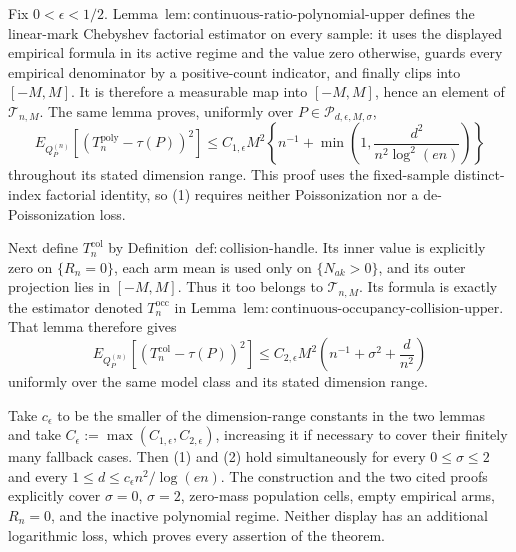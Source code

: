 Fix \(0<\epsilon<1/2\).  Lemma~\(\mathrm{lem:continuous\text{-}ratio\text{-}polynomial\text{-}upper}\) defines the linear-mark Chebyshev factorial estimator on every sample: it uses the displayed empirical formula in its active regime and the value zero otherwise, guards every empirical denominator by a positive-count indicator, and finally clips into \([-M,M]\).  It is therefore a measurable map into \([-M,M]\), hence an element of \(\mathcal T_{n,M}\).  The same lemma proves, uniformly over \(P\in\mathcal P_{d,\epsilon,M,\sigma}\),
\[
 E_{Q_P^{(n)}}[(T_n^{\mathrm{poly}}-\tau(P))^2]
 \le C_{1,\epsilon}M^2\left\{n^{-1}+
 \min\left(1,\frac{d^2}{n^2\log^2(en)}\right)\right\}                       \tag{1}
\]
throughout its stated dimension range.  This proof uses the fixed-sample distinct-index factorial identity, so (1) requires neither Poissonization nor a de-Poissonization loss.

Next define \(T_n^{\mathrm{col}}\) by Definition~\(\mathrm{def:collision\text{-}handle}\).  Its inner value is explicitly zero on \(\{R_n=0\}\), each arm mean is used only on \(\{N_{ak}>0\}\), and its outer projection lies in \([-M,M]\).  Thus it too belongs to \(\mathcal T_{n,M}\).  Its formula is exactly the estimator denoted \(T_n^{\mathrm{occ}}\) in Lemma~\(\mathrm{lem:continuous\text{-}occupancy\text{-}collision\text{-}upper}\).  That lemma therefore gives
\[
 E_{Q_P^{(n)}}[(T_n^{\mathrm{col}}-\tau(P))^2]
 \le C_{2,\epsilon}M^2\left(n^{-1}+\sigma^2+\frac d{n^2}\right)               \tag{2}
\]
uniformly over the same model class and its stated dimension range.

Take \(c_\epsilon\) to be the smaller of the dimension-range constants in the two lemmas and take \(C_\epsilon:=\max(C_{1,\epsilon},C_{2,\epsilon})\), increasing it if necessary to cover their finitely many fallback cases.  Then (1) and (2) hold simultaneously for every \(0\le\sigma\le2\) and every \(1\le d\le c_\epsilon n^2/\log(en)\).  The construction and the two cited proofs explicitly cover \(\sigma=0\), \(\sigma=2\), zero-mass population cells, empty empirical arms, \(R_n=0\), and the inactive polynomial regime.  Neither display has an additional logarithmic loss, which proves every assertion of the theorem.
